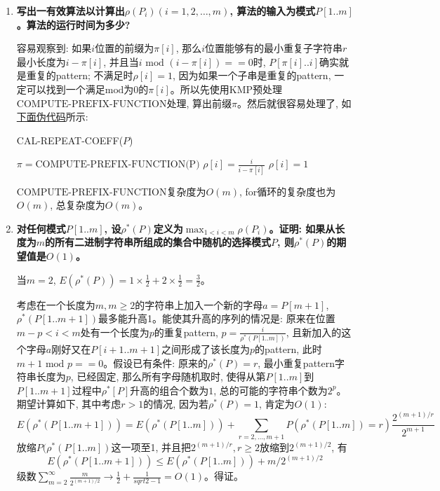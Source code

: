 \documentclass[paper=a4, fontsize=11pt]{scrartcl} %
\numberwithin{equation}{section} %
\numberwithin{figure}{section} %
\numberwithin{table}{section} %
\begin{document}
\begin{enumerate}[a]
\item \textbf{写出一有效算法以计算出$\rho(P_i)(i = 1,2,\dots,m)$, 算法的输入为模式$P[1..m]$。算法的运行时间为多少?}

  容易观察到: 如果$i$位置的前缀为$\pi[i]$, 那么$i$位置能够有的最小重复子字符串$r$最小长度为$i - \pi[i]$, 并且当$i \mbox{ mod } (i - \pi[i]) == 0$时, $P[\pi[i]..i]$确实就是重复的pattern; 不满足时$\rho[i] = 1$, 因为如果一个子串是重复的pattern, 一定可以找到一个满足$\mbox{mod}$为0的$\pi[i]$。所以先使用KMP预处理$\mbox{COMPUTE-PREFIX-FUNCTION}$处理, 算出前缀$\pi$。然后就很容易处理了, 如\hyperref[algo:2-2]{下面伪代码}所示:

  \begin{algorithm}[H]
  \caption{CAL-REPEAT-COEFF($P$)}
  \label{algo:2-2}
  \begin{algorithmic}
    \State $\pi = \mbox{COMPUTE-PREFIX-FUNCTION(P)}$
    \State $\rho[i] = \frac{i}{i - \pi[i]}$
    \Else
    \State $\rho[i] = 1$
    \EndIf
    \EndFor
  \end{algorithmic}
  \end{algorithm}

  $\mbox{COMPUTE-PREFIX-FUNCTION}$复杂度为$O(m)$, for循环的复杂度也为$O(m)$, 总复杂度为$O(m)$。

\item \textbf{对任何模式$P[1..m]$, 设$\rho^{*}(P)$定义为$\max_{1<i<m} \rho(P_i)$。证明: 如果从长度为$m$的所有二进制字符串所组成的集合中随机的选择模式$P$, 则$\rho^{*}(P)$的期望值是$O(1)$。}

  当$m = 2$, $E(\rho^{*}(P)) = 1 \times \frac{1}{2} + 2 \times \frac{1}{2} = \frac{3}{2}$。

  考虑在一个长度为$m, m \geq 2$的字符串上加入一个新的字母$a = P[m+1]$, $\rho^{*}(P[1..m+1])$最多能升高1。能使其升高的序列的情况是: 原来在位置$m - p < i < m$处有一个长度为$p$的重复pattern, $p = \frac{i}{\rho^{*}(P[1..m])}$, 且新加入的这个字母$a$刚好又在$P[i+1..m+1]$之间形成了该长度为$p$的pattern, 此时$m + 1 \mbox{ mod } p == 0$。假设已有条件: 原来的$\rho^{*}(P) = r$, 最小重复pattern字符串长度为$p$, 已经固定, 那么所有字母随机取时, 使得从第$P[1..m]$到$P[1..m+1]$过程中$\rho^{*}[P]$升高的组合个数为$1$, 总的可能的字符串个数为$2^{p}$。期望计算如下, 其中考虑$r > 1$的情况, 因为若$\rho^{*}(P) = 1$, 肯定为$O(1)$:
  \[
  E(\rho^{*}(P[1..m+1])) = E(\rho^{*}(P[1..m])) + \sum_{r=2, \dots, m+1} P(\rho^{*}(P[1..m]) = r) \frac{2^{(m+1)/r}}{2^{m+1}}
  \]
  放缩$P(\rho^{*}(P[1..m]) $这一项至1, 并且把$2^{(m+1)/r}, r \geq 2 $放缩到$2^{(m+1)/2}$, 有
  \[
  E(\rho^{*}(P[1..m+1])) \leq E(\rho^{*}(P[1..m])) + m / 2^{(m+1)/2}
  \]
  级数$\sum_{m=2}^{\infty} \frac{m}{2^{(m+1)/2}} \rightarrow \frac{1}{2} + \frac{1}{sqrt{2} - 1} = O(1)$。得证。


\end{enumerate}
\end{document}
